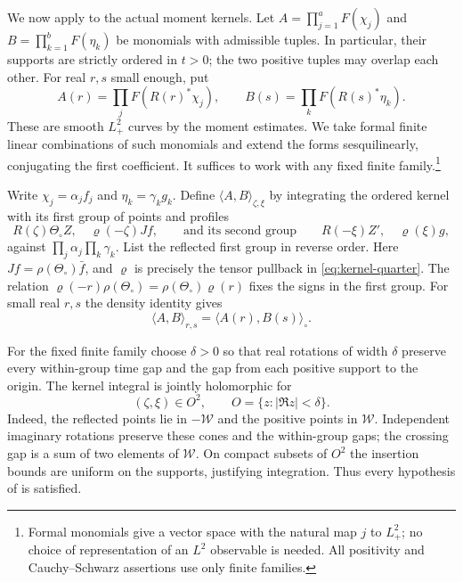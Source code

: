 \documentclass[11pt, letterpaper, reqno]{amsart}
\theoremstyle{definition}
\theoremstyle{remark}
\newcommand{\calW}{\mathcal{W}}
\begin{document}
We now apply  to the actual moment
kernels. Let $A=\prod_{j=1}^aF(\chi_j)$ and
$B=\prod_{k=1}^bF(\eta_k)$ be monomials with admissible tuples.
In particular, their supports are strictly ordered in $t>0$;
the two positive tuples may overlap each other.
For real $r,s$ small enough, put
\begin{equation}
 A(r)=\prod_jF(R(r)^*\chi_j),\qquad
 B(s)=\prod_kF(R(s)^*\eta_k).
\end{equation}
These are smooth $L^2_+$ curves by the moment estimates.
We take formal finite linear combinations of such monomials and
extend the forms sesquilinearly, conjugating the first coefficient.
It suffices to work with any fixed finite family.\footnote{Formal
monomials give a vector space with the natural map $j$ to $L^2_+$;
no choice of representation of an $L^2$ observable is needed. All
positivity and Cauchy--Schwarz assertions use only finite families.}

Write $\chi_j=\alpha_jf_j$ and $\eta_k=\gamma_kg_k$. Define
$\langle A,B\rangle_{\zeta,\xi}$ by integrating the ordered kernel
with its first group of points and profiles
\begin{equation}\label{eq:independent-rotations}
 R(\zeta)\Theta_\circ Z,\quad\varrho(-\zeta)Jf,
 \qquad\text{and its second group}\qquad
 R(-\xi)Z',\quad\varrho(\xi)g,
\end{equation}
against $\prod_j\alpha_j\prod_k\gamma_k$. List the reflected first
group in reverse order. Here $Jf=\rho(\Theta_\circ)\bar f$, and
$\varrho$ is precisely the tensor pullback in
\eqref{eq:kernel-quarter}. The relation
$\varrho(-r)\rho(\Theta_\circ)=\rho(\Theta_\circ)\varrho(r)$
fixes the signs in the first group. For small real $r,s$ the density
identity gives
\begin{equation}
 \langle A,B\rangle_{r,s}=\langle A(r),B(s)\rangle_\circ.
\end{equation}

For the fixed finite family choose $\delta>0$ so that real rotations
of width $\delta$ preserve every within-group time gap and the gap
from each positive support to the origin. The kernel integral is
jointly holomorphic for
\begin{equation}
 (\zeta,\xi)\in O^2,\qquad O=\{z:|\Re z|<\delta\}.
\end{equation}
Indeed, the reflected points lie in $-\calW$ and the positive points
in $\calW$. Independent imaginary rotations preserve these cones
and the within-group gaps; the crossing gap is a sum of two elements
of $\calW$. On compact subsets of $O^2$ the insertion bounds are
uniform on the supports, justifying integration. Thus every
hypothesis of  is satisfied.
\end{document}
